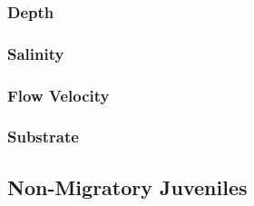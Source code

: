 \documentclass[
]{book}
\begin{document}
\hypertarget{depth-6}{%
\subsubsection{Depth}\label{depth-6}}

\hypertarget{salinity-6}{%
\subsubsection{Salinity}\label{salinity-6}}

\hypertarget{flow-velocity-6}{%
\subsubsection{Flow Velocity}\label{flow-velocity-6}}

\hypertarget{substrate-6}{%
\subsubsection{Substrate}\label{substrate-6}}

\hypertarget{non-migratory-juveniles-3}{%
\subsection{Non-Migratory Juveniles}\label{non-migratory-juveniles-3}}
\end{document}
